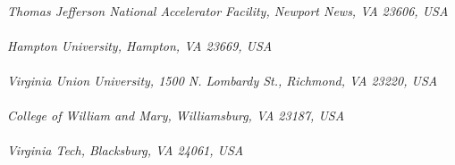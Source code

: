 \begin{titlepage}
\begin{center}
       \vspace*{0.6cm}
        \\
       \vspace*{0.2cm}
       \noindent \emph{Thomas Jefferson National Accelerator Facility, Newport News, VA 23606, USA} \\

       \vspace*{0.6cm}
        \\
       \vspace*{0.2cm}
       \noindent \emph{Hampton University, Hampton, VA 23669, USA} \\

       \vspace*{0.6cm}
        \\
       \vspace*{0.2cm}
       \noindent \emph{Virginia Union University, 1500 N. Lombardy St., 
        Richmond, VA 23220, USA} \\
 
       \vspace*{0.6cm}
        \\
       \vspace*{0.2cm}
       \noindent \emph{College of William and Mary, Williamsburg, VA 23187, 
        USA} \\
        
       \vspace*{0.6cm}
        \\
       \vspace*{0.2cm}
       \noindent \emph{Virginia Tech, Blacksburg, VA 24061, USA} \\
        
        
        \vspace*{0.7cm}
        \\
      \end{center}
\renewcommand*{\thefootnote}{\arabic{footnote}}

\date{\today}
     

\end{titlepage}
\sloppy

\titlepage

